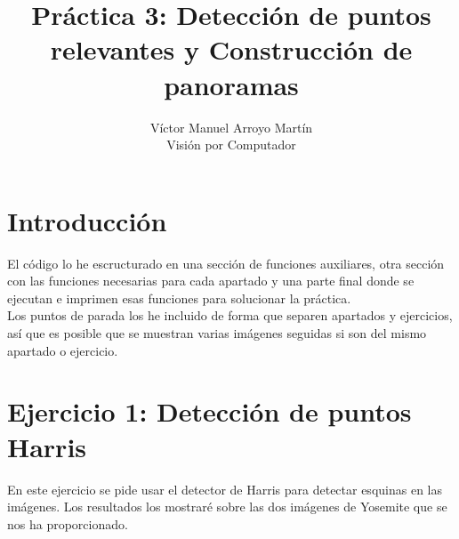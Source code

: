 \documentclass[12pt]{article}
\date{}
\begin{document}
 
\title{Práctica 3: Detección de puntos relevantes y Construcción de panoramas}
\author{Víctor Manuel Arroyo Martín\\ %
Visión por Computador}

\maketitle
\section*{Introducción}
El código lo he escructurado en una sección de funciones auxiliares, otra sección con las funciones necesarias para cada apartado y una parte final donde se ejecutan e imprimen esas funciones para solucionar la práctica.\\
Los puntos de parada los he incluido de forma que separen apartados y ejercicios, así que es posible que se muestran varias imágenes seguidas si son del mismo apartado o ejercicio.\\
\section*{Ejercicio 1: Detección de puntos Harris}
En este ejercicio se pide usar el detector de Harris para detectar esquinas en las imágenes. Los resultados los mostraré sobre las dos imágenes de Yosemite que se nos ha proporcionado.\\
\end{document}

